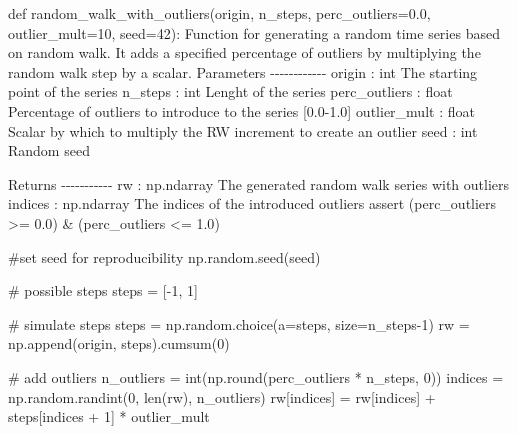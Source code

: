 \documentclass[
  letterpaper,
  DIV=11,
  numbers=noendperiod,
  oneside]{scrreprt}
\newenvironment{Shaded}{\begin{snugshade}}{\end{snugshade}}
\newcommand{\BuiltInTok}[1]{\textcolor[rgb]{0.00,0.23,0.31}{#1}}
\newcommand{\CommentTok}[1]{\textcolor[rgb]{0.37,0.37,0.37}{#1}}
\newcommand{\ControlFlowTok}[1]{\textcolor[rgb]{0.00,0.23,0.31}{#1}}
\newcommand{\DecValTok}[1]{\textcolor[rgb]{0.68,0.00,0.00}{#1}}
\newcommand{\FloatTok}[1]{\textcolor[rgb]{0.68,0.00,0.00}{#1}}
\newcommand{\KeywordTok}[1]{\textcolor[rgb]{0.00,0.23,0.31}{#1}}
\newcommand{\NormalTok}[1]{\textcolor[rgb]{0.00,0.23,0.31}{#1}}
\newcommand{\OperatorTok}[1]{\textcolor[rgb]{0.37,0.37,0.37}{#1}}
\begin{document}
\begin{Shaded}
\begin{Highlighting}[]
\KeywordTok{def}\NormalTok{ random\_walk\_with\_outliers(origin, n\_steps, perc\_outliers}\OperatorTok{=}\FloatTok{0.0}\NormalTok{, outlier\_mult}\OperatorTok{=}\DecValTok{10}\NormalTok{, seed}\OperatorTok{=}\DecValTok{42}\NormalTok{):}
    \CommentTok{\textquotesingle{}\textquotesingle{}\textquotesingle{}}
\CommentTok{    Function for generating a random time series based on random walk.}
\CommentTok{    It adds a specified percentage of outliers by multiplying the random walk step by a scalar.}
\CommentTok{    }
\CommentTok{    Parameters}
\CommentTok{    {-}{-}{-}{-}{-}{-}{-}{-}{-}{-}{-}{-}}
\CommentTok{    origin : int}
\CommentTok{        The starting point of the series}
\CommentTok{    n\_steps : int}
\CommentTok{        Lenght of the series}
\CommentTok{    perc\_outliers : float}
\CommentTok{        Percentage of outliers to introduce to the series [0.0{-}1.0]}
\CommentTok{    outlier\_mult : float}
\CommentTok{        Scalar by which to multiply the RW increment to create an outlier}
\CommentTok{    seed : int}
\CommentTok{        Random seed}

\CommentTok{    Returns}
\CommentTok{    {-}{-}{-}{-}{-}{-}{-}{-}{-}{-}{-}}
\CommentTok{    rw : np.ndarray}
\CommentTok{        The generated random walk series with outliers}
\CommentTok{    indices : np.ndarray}
\CommentTok{        The indices of the introduced outliers }
\CommentTok{    \textquotesingle{}\textquotesingle{}\textquotesingle{}}
    \ControlFlowTok{assert}\NormalTok{ (perc\_outliers }\OperatorTok{\textgreater{}=} \FloatTok{0.0}\NormalTok{) }\OperatorTok{\&}\NormalTok{ (perc\_outliers }\OperatorTok{\textless{}=} \FloatTok{1.0}\NormalTok{)}
    
    \CommentTok{\#set seed for reproducibility}
\NormalTok{    np.random.seed(seed)}
    
    \CommentTok{\# possible steps}
\NormalTok{    steps }\OperatorTok{=}\NormalTok{ [}\OperatorTok{{-}}\DecValTok{1}\NormalTok{, }\DecValTok{1}\NormalTok{]}

    \CommentTok{\# simulate steps}
\NormalTok{    steps }\OperatorTok{=}\NormalTok{ np.random.choice(a}\OperatorTok{=}\NormalTok{steps, size}\OperatorTok{=}\NormalTok{n\_steps}\OperatorTok{{-}}\DecValTok{1}\NormalTok{)}
\NormalTok{    rw }\OperatorTok{=}\NormalTok{ np.append(origin, steps).cumsum(}\DecValTok{0}\NormalTok{)}
    
    \CommentTok{\# add outliers}
\NormalTok{    n\_outliers }\OperatorTok{=} \BuiltInTok{int}\NormalTok{(np.}\BuiltInTok{round}\NormalTok{(perc\_outliers }\OperatorTok{*}\NormalTok{ n\_steps, }\DecValTok{0}\NormalTok{))}
\NormalTok{    indices }\OperatorTok{=}\NormalTok{ np.random.randint(}\DecValTok{0}\NormalTok{, }\BuiltInTok{len}\NormalTok{(rw), n\_outliers)}
\NormalTok{    rw[indices] }\OperatorTok{=}\NormalTok{ rw[indices] }\OperatorTok{+}\NormalTok{ steps[indices }\OperatorTok{+} \DecValTok{1}\NormalTok{] }\OperatorTok{*}\NormalTok{ outlier\_mult}
    

\end{Highlighting}
\end{Shaded}
\end{document}
